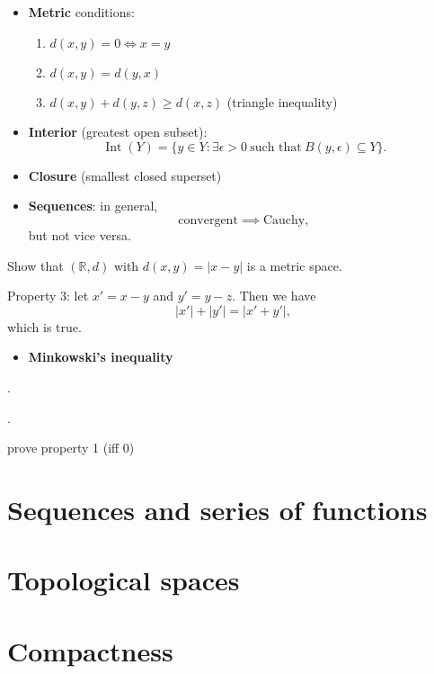 \begin{itemize}
    \item \textbf{Metric} conditions:
        \begin{enumerate}
            \item $d(x, y) = 0 \iff x = y$
            \item $d(x, y) = d(y, x)$
            \item $d(x, y) + d(y, z) \geq d(x, z)$ \quad (triangle inequality)
        \end{enumerate}
    \item \textbf{Interior} (greatest open subset):
        $$ \operatorname{Int}(Y) = \{ y \in Y : \exists \epsilon > 0 
            \ \text{such that} \ B(y, \epsilon) \subseteq Y \} . $$
    \item \textbf{Closure} (smallest closed superset)
    \item \textbf{Sequences}: in general,
        $$ \text{convergent} \implies \text{Cauchy} , $$
    but not vice versa.
\end{itemize}

\begin{problem}{4}{}

    Show that $(\mathbb{R}, d)$ with $d(x, y) = \lvert x - y \rvert$ is a metric space.

    \tcblower

    Property 3: let $x' = x - y$ and $y' = y - z$. Then we have
        $$ \lvert x' \rvert + \lvert y' \rvert = \lvert x' + y' \rvert, $$
    which is true.
\end{problem}

\begin{itemize}
    \item \textbf{Minkowski's inequality}
\end{itemize}

\begin{problem}{5}{}
    .
\end{problem}

\begin{problem}{6}{}
    .    
\end{problem}

\begin{problem}{12}{}
    prove property 1 (iff 0)
\end{problem}


\section{Sequences and series of functions}

\section{Topological spaces}

\section{Compactness}